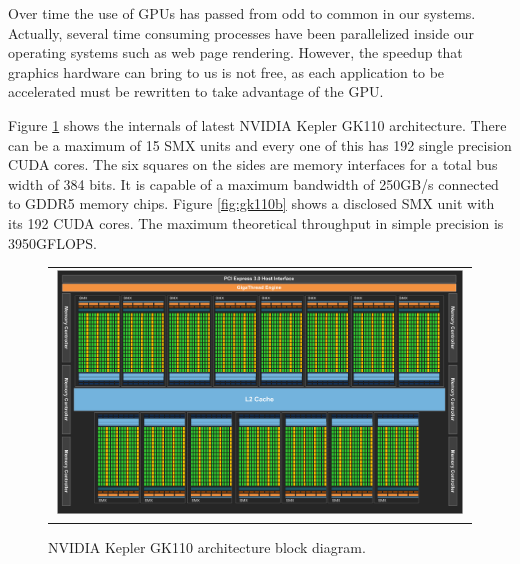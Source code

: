 \documentclass[review]{elsarticle}
\begin{document}
Over time the use of GPUs has passed from odd to common in our
systems. Actually, several time consuming processes have been
parallelized inside our operating systems such as web page
rendering. However, the speedup that graphics hardware can bring to us
is not free, as each application to be accelerated must be rewritten
to take advantage of the GPU. 

Figure \ref{fig:gk110a} shows the internals of latest NVIDIA Kepler
GK110 architecture. %
There can be a maximum of 15 SMX units and every
one of this has 192 single precision CUDA cores. The six squares on
the sides are memory interfaces for a total bus width of 384 bits. It
is capable of a maximum bandwidth of 250GB/s connected to GDDR5 memory
chips. Figure \ref{fig:gk110b} shows a disclosed SMX unit with its 192
CUDA cores. The maximum theoretical throughput in simple precision is
3950GFLOPS. 

\begin{figure}[!ht]
\begin{tabular}{c}
\includegraphics[width=0.99\textwidth]{nvidia-gk110.png} \\
\end{tabular}
\caption{NVIDIA Kepler GK110 architecture block diagram.}
\label{fig:gk110a}
\end{figure}
\end{document}
